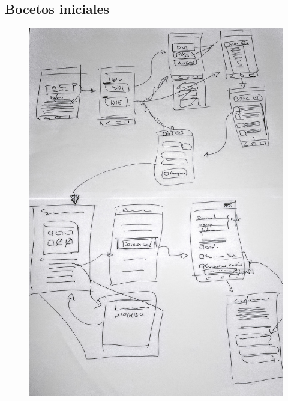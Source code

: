 \documentclass[a4paper,11pt]{article}
\begin{document}
\subsection{Bocetos iniciales}\label{bocetos}
\begin{figure}[H]
  \centering
  \includegraphics[scale=0.15]{bocetos.jpg}
\end{figure}
\end{document}
